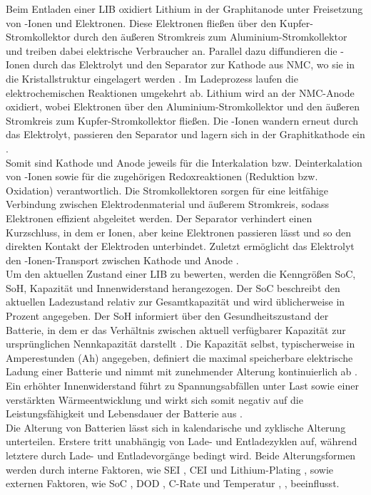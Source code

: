 Beim Entladen einer \acs{LIB} oxidiert Lithium in der Graphitanode unter Freisetzung von -Ionen und Elektronen. Diese Elektronen fließen über den Kupfer-Stromkollektor durch den äußeren Stromkreis zum Aluminium-Stromkollektor und treiben dabei elektrische Verbraucher an. Parallel dazu diffundieren die -Ionen durch das Elektrolyt und den Separator zur Kathode aus \ac{NMC}, wo sie in die Kristallstruktur eingelagert werden \cite{urlIdLIBFUnktionsweise}. Im Ladeprozess laufen die elektrochemischen Reaktionen umgekehrt ab. Lithium wird an der NMC-Anode oxidiert, wobei Elektronen über den Aluminium-Stromkollektor und den äußeren Stromkreis zum Kupfer-Stromkollektor fließen. Die -Ionen wandern erneut durch das Elektrolyt, passieren den Separator und lagern sich in der Graphitkathode ein \cite{urlIdLIBFUnktionsweise}.
\\
Somit sind Kathode und Anode jeweils für die Interkalation bzw. Deinterkalation von -Ionen sowie für die zugehörigen Redoxreaktionen (Reduktion bzw. Oxidation) verantwortlich. Die Stromkollektoren sorgen für eine leitfähige Verbindung zwischen Elektrodenmaterial und äußerem Stromkreis, sodass Elektronen effizient abgeleitet werden. Der Separator verhindert einen Kurzschluss, in dem er Ionen, aber keine Elektronen passieren lässt und so den direkten Kontakt der Elektroden unterbindet. Zuletzt ermöglicht das Elektrolyt den -Ionen-Transport zwischen Kathode und Anode \cite{urlIdDifferentAgingMethodsForLIBs}.
\\
Um den aktuellen Zustand einer \acs{LIB} zu bewerten, werden die Kenngrößen \ac{SoC}, \ac{SoH}, Kapazität und Innenwiderstand herangezogen. Der \acs{SoC} beschreibt den aktuellen Ladezustand relativ zur Gesamtkapazität und wird üblicherweise in Prozent angegeben. Der \acs{SoH} informiert über den Gesundheitszustand der Batterie, in dem er das Verhältnis zwischen aktuell verfügbarer Kapazität zur ursprünglichen Nennkapazität darstellt \cite{urlIdSoCSoHDependencyLIBs}. Die Kapazität selbst, typischerweise in Amperestunden (Ah) angegeben, definiert die maximal speicherbare elektrische Ladung einer Batterie und nimmt mit zunehmender Alterung kontinuierlich ab \cite{articleAlterungLithiumBatterien}. Ein erhöhter Innenwiderstand führt zu Spannungsabfällen unter Last sowie einer verstärkten Wärmeentwicklung und wirkt sich somit negativ auf die Leistungsfähigkeit und Lebensdauer der Batterie aus \cite{urlIdBatterieALterungInternerWiderstand}.
\\
Die Alterung von Batterien lässt sich in kalendarische und zyklische Alterung unterteilen. Erstere tritt unabhängig von Lade- und Entladezyklen auf, während letztere durch Lade- und Entladevorgänge bedingt wird. Beide Alterungsformen werden durch interne Faktoren, wie \ac{SEI} \cite{urlIdBatterieAlterungSEI}, \ac{CEI} \cite{urlIdBatterieAlterungCEI} und Lithium-Plating \cite{urlIdBatterieAlterungLithiumPlating}, sowie externen Faktoren, wie \acs{SoC} \cite{urlIdBatterieAlterungVerschiedenerSoCLithiumBatterien}, \ac{DOD} \cite{urlIdAlterungDOD}, C-Rate \cite{urlIdBatterieNiedrigeTemperaturenLithiumBatterien} und Temperatur \cite{urlIdBatterieAlterungTemperatur}, \cite{urlIdBatterieAlterungTemperatur2}, beeinflusst.

